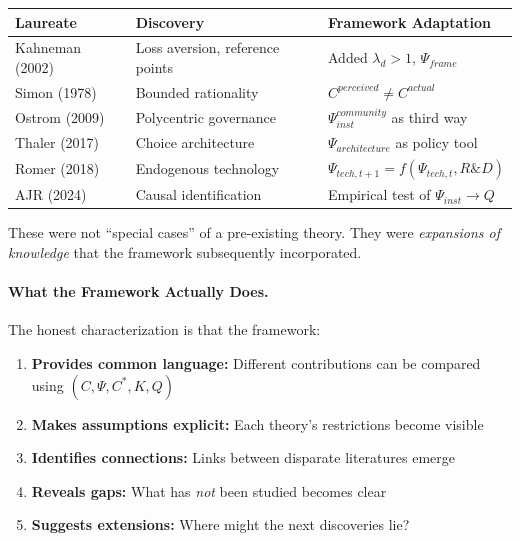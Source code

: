 \documentclass[12pt,a4paper]{article}
\begin{document}
\begin{center}
\renewcommand{\arraystretch}{1.3}
\small
\begin{tabular}{lll}
\hline
\textbf{Laureate} & \textbf{Discovery} & \textbf{Framework Adaptation} \\
\hline
Kahneman (2002) & Loss aversion, reference points & Added $\lambda_d > 1$, $\Psi_{frame}$ \\
Simon (1978) & Bounded rationality & $C^{perceived} \neq C^{actual}$ \\
Ostrom (2009) & Polycentric governance & $\Psi_{inst}^{community}$ as third way \\
Thaler (2017) & Choice architecture & $\Psi_{architecture}$ as policy tool \\
Romer (2018) & Endogenous technology & $\Psi_{tech,t+1} = f(\Psi_{tech,t}, R\&D)$ \\
AJR (2024) & Causal identification & Empirical test of $\Psi_{inst} \to Q$ \\
\hline
\end{tabular}
\end{center}

These were not ``special cases'' of a pre-existing theory.
They were \emph{expansions of knowledge} that the framework subsequently incorporated.

\paragraph{What the Framework Actually Does.}
The honest characterization is that the framework:
\begin{enumerate}
  \item \textbf{Provides common language:} Different contributions can be 
        compared using $(C, \Psi, C^*, K, Q)$
  \item \textbf{Makes assumptions explicit:} Each theory's restrictions become visible
  \item \textbf{Identifies connections:} Links between disparate literatures emerge
  \item \textbf{Reveals gaps:} What has \emph{not} been studied becomes clear
  \item \textbf{Suggests extensions:} Where might the next discoveries lie?
\end{enumerate}
\end{document}
